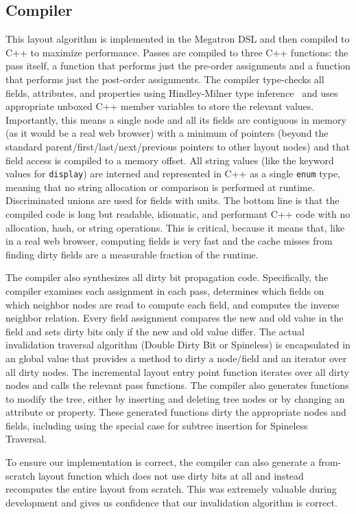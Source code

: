 \subsection{Compiler}
\label{sec-compiler}


This layout algorithm is implemented in the Megatron DSL
  and then compiled to C++ to maximize performance.
Passes are compiled to three C++ functions:
  the pass itself,
  a function that performs just the pre-order assignments
  and a function that performs just the post-order assignments.
The compiler type-checks all fields, attributes, and properties
  using Hindley-Milner type inference~\cite{HM}
  and uses appropriate unboxed C++ member variables
  to store the relevant values.
Importantly, this means a single node and all its fields
  are contiguous in memory
  (as it would be a real web browser)
  with a minimum of pointers
  (beyond the standard parent/first/last/next/previous pointers
  to other layout nodes)
  and that field access is compiled to a memory offset.
All string values (like the keyword values for \texttt{display})
  are interned and represented in C++ as
  a single \texttt{enum} type,
  meaning that no string allocation or comparison
  is performed at runtime.
Discriminated unions are used for fields with units.
The bottom line is that the compiled code is
  long but readable, idiomatic, and performant C++ code
  with no allocation, hash, or string operations.
This is critical, because it means that,
  like in a real web browser,
  computing fields is very fast
  and the cache misses from finding dirty fields
  are a measurable fraction of the runtime.

The compiler also synthesizes all
  dirty bit propagation code.
Specifically, the compiler examines
  each assignment in each pass,
  determines which fields on which neighbor nodes are read
  to compute each field,
  and computes the inverse neighbor relation.
Every field assignment
  compares the new and old value in the field
  and sets dirty bits only if the new and old value differ.
The actual invalidation traversal algorithm
  (Double Dirty Bit or Spineless)
  is encapsulated in an global value
  that provides a method to dirty a node/field
  and an iterator over all dirty nodes.
The incremental layout entry point function
  iterates over all dirty nodes
  and calls the relevant pass functions.
The compiler also generates functions to modify the tree,
  either by inserting and deleting tree nodes
  or by changing an attribute or property.
These generated functions dirty the appropriate nodes and fields,
  including using the special case for subtree insertion
  for Spineless Traversal.

To ensure our implementation is correct,
  the compiler can also generate a from-scratch layout function
  which does not use dirty bits at all
  and instead recomputes the entire layout from scratch.
This was extremely valuable during development
  and gives us confidence that our invalidation algorithm is correct.
